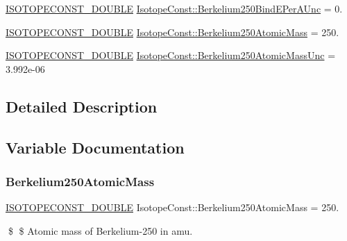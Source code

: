\begin{DoxyCompactItemize}
\mbox{\hyperlink{group___isotope_const-_macros_ga8f45a7272ce02c0b4c65c44636ed719a}{I\+S\+O\+T\+O\+P\+E\+C\+O\+N\+S\+T\+\_\+\+D\+O\+U\+B\+LE}} \mbox{\hyperlink{group___isotope_const-_berkelium-_bk250_ga614a9c0806fd3c690299147f4497b875}{Isotope\+Const\+::\+Berkelium250\+Bind\+E\+Per\+A\+Unc}} = 0.
\item 
\mbox{\hyperlink{group___isotope_const-_macros_ga8f45a7272ce02c0b4c65c44636ed719a}{I\+S\+O\+T\+O\+P\+E\+C\+O\+N\+S\+T\+\_\+\+D\+O\+U\+B\+LE}} \mbox{\hyperlink{group___isotope_const-_berkelium-_bk250_ga6731d4f1b44a70e8419733eb6b977f80}{Isotope\+Const\+::\+Berkelium250\+Atomic\+Mass}} = 250.
\item 
\mbox{\hyperlink{group___isotope_const-_macros_ga8f45a7272ce02c0b4c65c44636ed719a}{I\+S\+O\+T\+O\+P\+E\+C\+O\+N\+S\+T\+\_\+\+D\+O\+U\+B\+LE}} \mbox{\hyperlink{group___isotope_const-_berkelium-_bk250_gab62d1e5d48d5941ef615c645be227d26}{Isotope\+Const\+::\+Berkelium250\+Atomic\+Mass\+Unc}} = 3.\+992e-\/06
\end{DoxyCompactItemize}


\subsection{Detailed Description}


\subsection{Variable Documentation}
\mbox{\label{group___isotope_const-_berkelium-_bk250_ga6731d4f1b44a70e8419733eb6b977f80}} 
\subsubsection{\texorpdfstring{Berkelium250\+Atomic\+Mass}{Berkelium250AtomicMass}}
{\footnotesize\ttfamily \mbox{\hyperlink{group___isotope_const-_macros_ga8f45a7272ce02c0b4c65c44636ed719a}{I\+S\+O\+T\+O\+P\+E\+C\+O\+N\+S\+T\+\_\+\+D\+O\+U\+B\+LE}} Isotope\+Const\+::\+Berkelium250\+Atomic\+Mass = 250.}

\$ \$ Atomic mass of Berkelium-\/250 in amu. \mbox{\label{group___isotope_const-_berkelium-_bk250_gab62d1e5d48d5941ef615c645be227d26}} 
